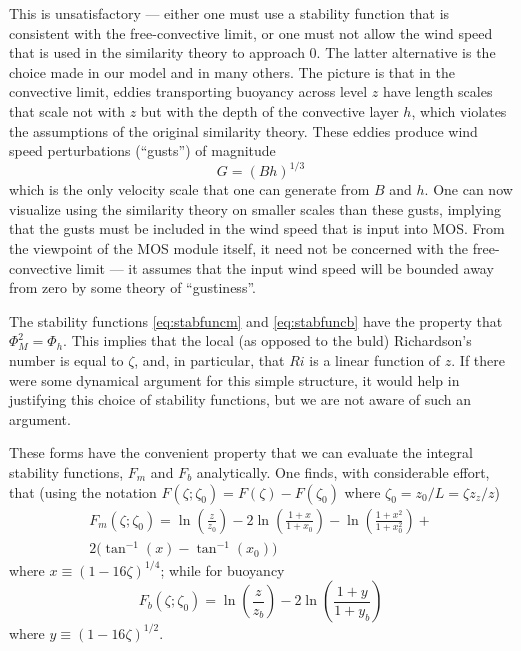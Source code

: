 \documentclass[12pt, letterpaper]{article}
\begin{document}
This is unsatisfactory --- either one must use a stability function
that is consistent with the free-convective limit, or one must not
allow the wind speed that is used in the similarity theory to approach
0.  The latter alternative is the choice made in our model and in many
others.  The picture is that in the convective limit, eddies
transporting buoyancy across level $z$ have length scales that scale
not with $z$ but with the depth of the convective layer $h$, which
violates the assumptions of the original similarity theory.  These
eddies produce wind speed perturbations (``gusts'') of magnitude
\begin{equation}
  G = (Bh)^{1/3}
\end{equation}
which is the only velocity scale that one can generate from $B$ and
$h$.  One can now visualize using the similarity theory on smaller
scales than these gusts, implying that the gusts must be included in
the wind speed that is input into MOS.  From the viewpoint of the MOS
module itself, it need not be concerned with the free-convective limit
--- it assumes that the input wind speed will be bounded away from
zero by some theory of ``gustiness''.

The stability functions \eqref{eq:stabfuncm} and \eqref{eq:stabfuncb}
have the property that $\Phi_M^2 = \Phi_h$.  This implies that the
local (as opposed to the buld) Richardson's number is equal to
$\zeta$, and, in particular, that $Ri$ is a linear function of $z$.
If there were some dynamical argument for this simple structure, it
would help in justifying this choice of stability functions, but we
are not aware of such an argument.

These forms have the convenient property that we can evaluate the
integral stability functions, $F_m$ and $F_b$ analytically.  One
finds, with considerable effort, that (using the notation
$F(\zeta;\zeta_0) = F(\zeta) - F(\zeta_0)$ where $\zeta_0 = z_0/L =
\zeta z_z/z$)
\begin{multline}
  F_m(\zeta;\zeta_0) =
  \ln\left(\frac{z}{z_0}\right) - 2\ln\left(\frac{1+x}{1+x_0}\right) - \ln\left(\frac{1+x^2}{1+x_0^2}\right) + \\
  2\big(\tan^{-1}(x)-\tan^{-1}(x_0)\big)
\end{multline}
where $x \equiv (1-16\zeta)^{1/4}$; while for buoyancy
\begin{equation}
  F_b(\zeta;\zeta_0) = \ln\left(\frac{z}{z_b}\right)-2\ln\left(\frac{1+y}{1+y_b}\right)
\end{equation}
where $y \equiv (1-16\zeta)^{1/2}$.
\end{document}
